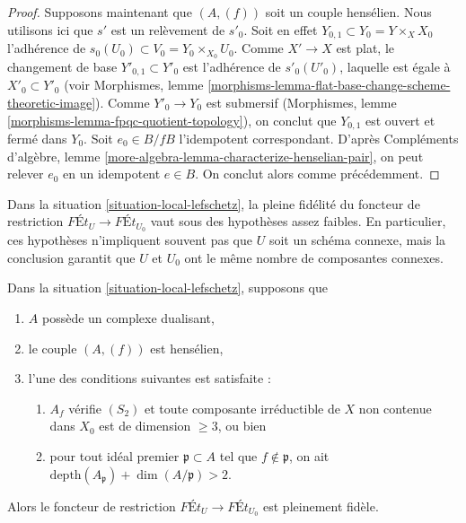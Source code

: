 \begin{proof}
\medskip\noindent
Supposons maintenant que $(A, (f))$ soit un couple hensélien. Nous utilisons ici que $s'$ est
un relèvement de $s'_0$. Soit en effet $Y_{0, 1} \subset Y_0 = Y \times_X X_0$
l'adhérence de $s_0(U_0) \subset V_0 = Y_0 \times_{X_0} U_0$.
Comme $X' \to X$ est plat, le changement de base $Y'_{0, 1} \subset Y'_0$
est l'adhérence de $s'_0(U'_0)$, laquelle est égale à $X'_0 \subset Y'_0$
(voir Morphismes, lemme
\ref{morphisms-lemma-flat-base-change-scheme-theoretic-image}).
Comme $Y'_0 \to Y_0$ est submersif
(Morphismes, lemme \ref{morphisms-lemma-fpqc-quotient-topology}),
on conclut que $Y_{0, 1}$ est ouvert et fermé dans $Y_0$.
Soit $e_0 \in B/fB$ l'idempotent correspondant.
D'après Compléments d'algèbre, lemme
\ref{more-algebra-lemma-characterize-henselian-pair},
on peut relever $e_0$ en un idempotent $e \in B$.
On conclut alors comme précédemment.
\end{proof}

\noindent
Dans la situation \ref{situation-local-lefschetz},
la pleine fidélité du foncteur de restriction
$\textit{F\'Et}_U \longrightarrow \textit{F\'Et}_{U_0}$
vaut sous des hypothèses assez faibles.
En particulier, ces hypothèses n'impliquent souvent pas que
$U$ soit un schéma connexe, mais la conclusion garantit
que $U$ et $U_0$ ont le même nombre de composantes connexes.

\begin{lemma}
\label{lemma-fully-faithful-simple}
Dans la situation \ref{situation-local-lefschetz}, supposons que
\begin{enumerate}
\item[(a)] $A$ possède un complexe dualisant,
\item[(b)] le couple $(A, (f))$ est hensélien,
\item[(c)] l'une des conditions suivantes est satisfaite :
\begin{enumerate}
\item[(i)] $A_f$ vérifie $(S_2)$ et toute composante irréductible de $X$
non contenue dans $X_0$ est de dimension $\geq 3$, ou bien
\item[(ii)] pour tout idéal premier
$\mathfrak p \subset A$ tel que $f \not \in \mathfrak p$, on ait
$\text{depth}(A_\mathfrak p) + \dim(A/\mathfrak p) > 2$.
\end{enumerate}
\end{enumerate}
Alors le foncteur de restriction
$\textit{F\'Et}_U \longrightarrow \textit{F\'Et}_{U_0}$
est pleinement fidèle.
\end{lemma}

